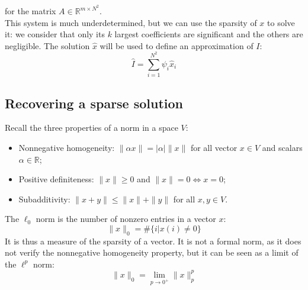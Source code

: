 \documentclass[12pt, openany]{report}
\newcommand{\R}{\mathbb{R}}
\theoremstyle{definition}
\begin{document}
for the matrix $A\in \R^{m\times N^2}$.\\
This system is much underdetermined, but we can use the sparsity of $x$ to solve it: we consider that only its $k$ largest coefficients are significant and the others are negligible. The solution $\hat x$ will be used to define an approximation of $I$:
\begin{equation}
	\hat I = \sum_{i=1}^{N^2} \psi_i \hat x_i
\end{equation}
\subsection{Recovering a sparse solution}
Recall the three properties of a norm in a space $V$:
\begin{itemize}
	\item Nonnegative homogeneity: $\|\alpha x\| = |\alpha| \|x\|$ for all vector $x\in V$ and scalars $\alpha\in \R$;
	\item Positive definiteness: $\|x\|\ge 0$ and $\|x\|=0\Longleftrightarrow x=0$;
	\item Subadditivity: $\|x+y\|\le \|x\| + \|y\|$ for all $x,y\in V$.
\end{itemize}
The $\ell_0$ norm is the number of nonzero entries in a vector $x$:
\begin{equation}
	\|x\|_0 = \#\{i|x(i)\neq 0\}
\end{equation}
It is thus a measure of the sparsity of a vector. It is not a formal norm, as it does not verify the nonnegative homogeneity property, but it can be seen as a limit of the $\ell^p$ norm:
\begin{equation}
	\|x\|_0 = \lim_{p\to 0^+} \|x\|_p^p
\end{equation}
\end{document}
